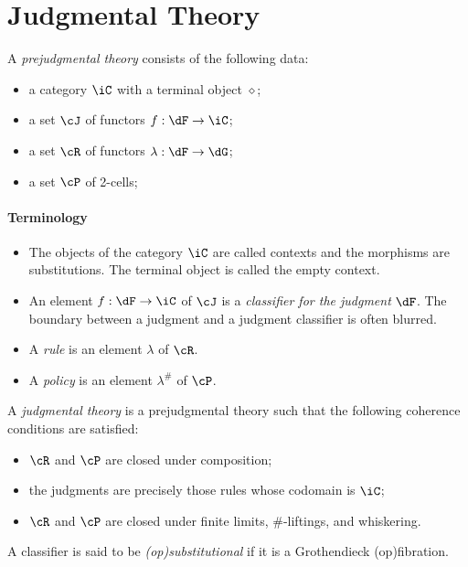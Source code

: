 \documentclass{amsart}
\begin{document}
\section{Judgmental Theory}
\label{sec:judgmental-theory}
\begin{defn}
  A \emph{prejudgmental theory} consists of the following data:
  \begin{itemize}
  \item a category $\iC$ with a terminal object $\diamond$;
  \item a set $\cJ$ of functors $f : \dF \to \iC$;
  \item a set $\cR$ of functors $\lambda : \dF \to \dG$;
  \item a set $\cP$ of 2-cells;
  \end{itemize}
\end{defn}

\paragraph{\textbf{Terminology}}
\begin{itemize}
\item The objects of the category $\iC$ are called contexts and the morphisms are substitutions.
  The terminal object is called the empty context.
\item An element $f : \dF \to \iC$ of $\cJ$ is a \emph{classifier for the judgment} $\dF$.
  The boundary between a judgment and a judgment classifier is often blurred.
\item A \emph{rule} is an element $\lambda$ of $\cR$.
\item A \emph{policy} is an element $\lambda^{\#}$ of $\cP$.
\end{itemize}

\begin{defn}
  A \emph{judgmental theory} is a prejudgmental theory such that the following coherence conditions are satisfied:
  \begin{itemize}
  \item $\cR$ and $\cP$ are closed under composition;
  \item the judgments are precisely those rules whose codomain is $\iC$;
  \item $\cR$ and $\cP$ are closed under finite limits, $\#$-liftings, and whiskering.
  \end{itemize}
  A classifier is said to be \emph{(op)substitutional} if it is a Grothendieck (op)fibration.
\end{defn}
\end{document}
